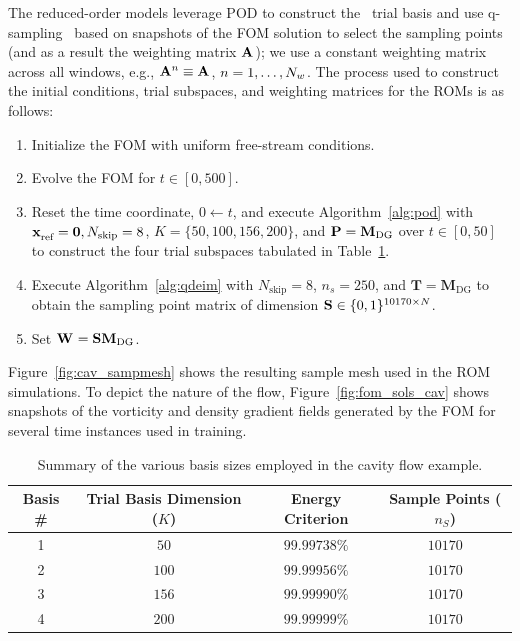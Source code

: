 The reduced-order models leverage POD to construct the \spatialAcronym\ trial basis and use q-sampling~\cite{qdeim_drmac} based on snapshots of the FOM solution to select the sampling points (and as a result the weighting 
matrix $\mathbf{A}^{}$); we use a constant weighting matrix across all windows, e.g., $\mathbf{A}^{n} \equiv \mathbf{A}^{}$, $n=1,\ldots,N_w$. The process used to construct the initial conditions, trial subspaces, and weighting matrices for the ROMs is as follows:
\begin{enumerate}
\item Initialize the FOM with uniform free-stream conditions.
\item Evolve the FOM for $t \in [0,500]$.
\item Reset the time coordinate, $0 \leftarrow t$, and execute Algorithm~\ref{alg:pod} with $\mathbf{x}_\text{ref}^{} = \boldsymbol 0, N_{\text{skip}} = 8$, $K = \{50,100,156,200\}$, and $\mathbf{P} =  \mathbf{M}_{\text{DG}}$ over $t \in [0,50]$ to construct the four trial subspaces tabulated in Table~\ref{tab:rom_basis_details}. 
\item Execute Algorithm~\ref{alg:qdeim} with $N_{\text{skip}} = 8$, $n_s = 250$, and $\mathbf{T} = \mathbf{M}_{\text{DG}}$ to obtain the sampling point matrix of dimension $\mathbf{S} \in \{0,1\}^{10170 \times N }$.
\item Set $\mathbf{W}^{} = \mathbf{S} \mathbf{M}_{\text{DG}}$. 
\end{enumerate}
Figure~\ref{fig:cav_sampmesh} shows the resulting sample mesh used in the ROM simulations. To depict the nature of the flow, Figure~\ref{fig:fom_sols_cav} shows snapshots of the vorticity and density gradient fields generated by the FOM for several time instances used in training.  
\begin{table}[]
\begin{centering}
\begin{tabular}{c c c c}
\hline
Basis \# & Trial Basis Dimension ($K$) &  Energy Criterion & Sample Points ($n_S$) \\
\hline
1    & $50$ &  $99.99738\%$ & $10170$ \\
2    & $100$ & $99.99956\%$ & $10170$ \\
3    & $156$ & $99.99990\%$ & $10170$ \\
4    & $200$ & $99.99999\%$ & $10170$ \\
\hline
\end{tabular}
\caption{Summary of the various basis sizes employed in the cavity flow example.}
\label{tab:rom_basis_details}
\end{centering}
\end{table}

